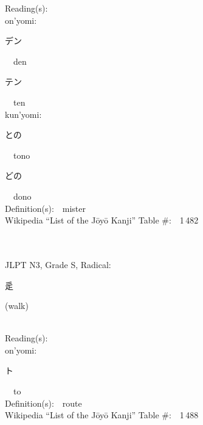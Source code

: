 \begin{multicols}{2}
Reading(s):\ \ \\
{\hspace*{1em}}on'yomi:\ \ \\
{\hspace*{2em}}{\begin{CJK}{UTF8}{min} デン \end{CJK}}\ \ den\ \ \\
{\hspace*{2em}}{\begin{CJK}{UTF8}{min} テン \end{CJK}}\ \ ten\ \ \\
{\hspace*{1em}}kun'yomi:\ \ \\
{\hspace*{2em}}{\begin{CJK}{UTF8}{min} との \end{CJK}}\ \ tono\ \ \\
{\hspace*{2em}}{\begin{CJK}{UTF8}{min} どの \end{CJK}}\ \ dono\ \ \\
Definition(s):\ \ mister \\
Wikipedia ``List of the J\=oy\=o Kanji'' Table \#:\ \ 1\,482 \\
\ \ \\
{\fontsize{34pt}{40pt}  }\ \ \\  %
{JLPT N3, Grade S, Radical:\ \ {\begin{CJK}{UTF8}{min} 辵 \end{CJK}} (walk) } \\
Reading(s):\ \ \\
{\hspace*{1em}}on'yomi:\ \ \\
{\hspace*{2em}}{\begin{CJK}{UTF8}{min} ト \end{CJK}}\ \ to\ \ \\
Definition(s):\ \ route \\
Wikipedia ``List of the J\=oy\=o Kanji'' Table \#:\ \ 1\,488 \\
\ \ \\
{\fontsize{34pt}{40pt}  }\ \ \\  %

\end{multicols}
